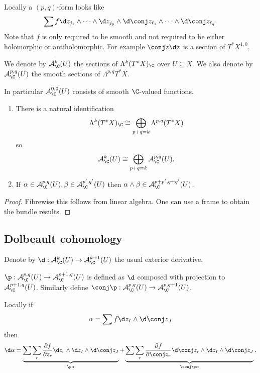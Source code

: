 \documentclass[a4paper]{article}
\newcommand{\w}{\wedge} %
\begin{document}
Locally a \((p, q)\)-form looks like
\[
  \sum f \d z_{j_1} \w \cdots \w \d z_{j_p} \w \d\conj z_{\ell_1} \w \cdots \w \d\conj z_{\ell_q}.
\]
Note that \(f\) is only required to be smooth and not required to be either holomorphic or antiholomorphic. For example \(\conj z \d z\) is a section of \(T^*X^{1, 0}\).

\begin{definition}
  We denote by \(\mathcal A_\C^k(U)\) the sections of \(\Lambda^k(T^*X)_\C\) over \(U \subseteq X\). We also denote by \(\mathcal A_\C^{p, q}(U)\) the smooth sections of \(\Lambda^{p, q}T^*X\).
\end{definition}
In particular \(\mathcal A_\C^{0, 0}(U)\) consists of smooth \(\C\)-valued functions.

\begin{lemma}\leavevmode
  \begin{enumerate}
  \item There is a natural identification
    \[
      \Lambda^k(T^*X)_\C \cong \bigoplus_{p + q = k} \Lambda^{p, q} (T^*X)
    \]
    so
    \[
      \mathcal A_\C^k(U) \cong \bigoplus_{p + q = k} \mathcal A_\C^{p, q} (U).
    \]
  \item If \(\alpha \in \mathcal A_\C^{p, q}(U), \beta \in \mathcal A_\C^{p', q'}(U)\) then \(\alpha \w \beta \in \mathcal A_\C^{p + p', q + q'}(U)\).
  \end{enumerate}
\end{lemma}

\begin{proof}
  Fibrewise this follows from linear algebra. One can use a frame to obtain the bundle results.
\end{proof}

\subsection{Dolbeault cohomology}

Denote by \(\d: \mathcal A_\C^k(U) \to \mathcal A_\C^{k + 1}(U)\) the usual exterior derivative.

\begin{definition}
  \(\p: \mathcal A_\C^{p, q}(U) \to \mathcal A_\C^{p + 1, q}(U)\) is defined as \(\d\) composed with projection to \(\mathcal A_\C^{p + 1, q}(U)\). Similarly define \(\conj \p: \mathcal A_\C^{p, q}(U) \to \mathcal A_\C^{p, q + 1}(U)\).
\end{definition}

Locally if
\[
  \alpha = \sum f \d z_I \w \d \conj z_J
\]
then
\[
  \d \alpha = \underbrace{\sum \sum_r \frac{\partial f}{\partial z_r} \d z_r \w \d z_I \w \d \conj z_J}_{\p \alpha} + \underbrace{\sum \sum_r \frac{\partial f}{\partial \conj z_r} \d \conj z_r \w \d z_I \w \d \conj z_J}_{\conj \p \alpha}.
\]
\end{document}
